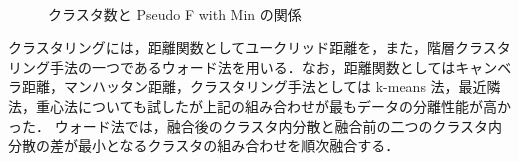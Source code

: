 \documentclass[technicalreport]{ieicej}
\begin{document}
\begin{figure}[tb]
\vspace*{-0.8cm}
\begin{center}
~
\caption{クラスタ数と Pseudo F with Min の関係}
\label{PseudoFwithMinPlot}
\end{center}
\end{figure}
クラスタリングには，距離関数としてユークリッド距離を，また，階層クラスタリング手法の一つであるウォード法\cite{murtagh2014ward}を用いる．なお，距離関数としてはキャンベラ距離，マンハッタン距離，クラスタリング手法としては k-means 法，最近隣法，重心法についても試したが上記の組み合わせが最もデータの分離性能が高かった．
ウォード法では，融合後のクラスタ内分散と融合前の二つのクラスタ内分散の差が最小となるクラスタの組み合わせを順次融合する．
\end{document}
